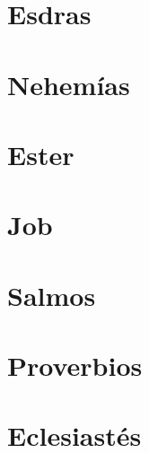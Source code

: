 \chapter{Esdras}
\begin{multicols}{2}
  \parskip=0pt \relax
  
\end{multicols}

\chapter{Nehemías}
\begin{multicols}{2}
  \parskip=0pt \relax
  
\end{multicols}

\chapter{Ester}
\begin{multicols}{2}
  \parskip=0pt \relax
  
\end{multicols}

\chapter{Job}
\begin{multicols}{2}
  \parskip=0pt \relax
  
\end{multicols}

\chapter{Salmos}
\begin{multicols}{2}
  \parskip=0pt \relax
  
\end{multicols}

\chapter{Proverbios}
\begin{multicols}{2}
  \parskip=0pt \relax
  
\end{multicols}

\chapter{Eclesiastés}
\begin{multicols}{2}
  \parskip=0pt \relax
  
\end{multicols}

